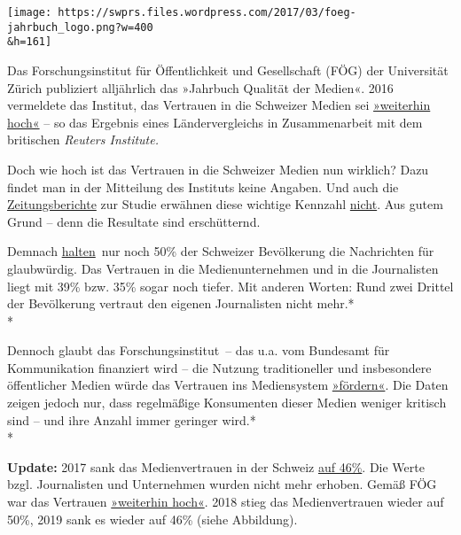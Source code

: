 \texttt{[image: https://swprs.files.wordpress.com/2017/03/foeg-jahrbuch\_logo.png?w=400\\\&h=161]}

Das Forschungsinstitut für Öffentlichkeit und Gesellschaft (FÖG) der
Universität Zürich publiziert alljährlich das »Jahrbuch Qualität der
Medien«. 2016 vermeldete das Institut, das Vertrauen in die Schweizer
Medien sei
\href{http://www.foeg.uzh.ch/dam/jcr:7234c6d3-1f09-4d36-b6ab-f14e659d046e/Medienmitteilung_JB_2016_dt.pdf}{»weiterhin
hoch«} -- so das Ergebnis eines Ländervergleichs in Zusammenarbeit mit
dem britischen \emph{Reuters Institute.}

Doch wie hoch ist das Vertrauen in die Schweizer Medien nun wirklich?
Dazu findet man in der Mitteilung des Instituts keine Angaben. Und auch
die
\href{http://www.tagesanzeiger.ch/schweiz/standard/Diese-Menschen-sind-anfaellig-fuer-Populisten/story/23804017}{Zeitungsberichte}
zur Studie erwähnen diese wichtige Kennzahl
\href{http://www.nzz.ch/schweiz/analyse-zum-medienvertrauen-oeffentliche-medien-staerken-auch-die-privaten-ld.128965}{nicht}.
Aus gutem Grund -- denn die Resultate sind erschütternd.

Demnach
\href{http://media.digitalnewsreport.org/wp-content/uploads/2018/11/Digital-News-Report-2016.pdf\#page=60}{halten}~nur
noch 50\% der Schweizer Bevölkerung die Nachrichten für glaubwürdig. Das
Vertrauen in die Medienunternehmen und in die Journalisten liegt mit
39\% bzw. 35\% sogar noch tiefer. Mit anderen Worten: Rund zwei Drittel
der Bevölkerung vertraut den eigenen Journalisten nicht mehr.*\\
*

Dennoch glaubt das Forschungsinstitut~-- das u.a. vom Bundesamt für
Kommunikation finanziert wird -- die Nutzung traditioneller und
insbesondere öffentlicher Medien würde das Vertrauen ins Mediensystem
\href{http://www.foeg.uzh.ch/dam/jcr:7234c6d3-1f09-4d36-b6ab-f14e659d046e/Medienmitteilung_JB_2016_dt.pdf}{»fördern«}.
Die Daten zeigen jedoch nur, dass regelmäßige Konsumenten dieser Medien
weniger kritisch sind -- und ihre Anzahl immer geringer wird.*\\
*

\textbf{Update:} 2017 sank das Medienvertrauen in der Schweiz
\href{http://www.digitalnewsreport.org/survey/2017/switzerland-2017/}{auf
46\%}. Die Werte bzgl. Journalisten und Unternehmen wurden nicht mehr
erhoben. Gemäß FÖG war das Vertrauen
\href{http://www.foeg.uzh.ch/dam/jcr:0d0e5a10-27be-4e97-b264-b2cf7de96bbd/Broschur_Jahrbuch_foeg_deutsch_2017_ohne_Sperrvermerk.pdf}{»weiterhin
hoch«}. 2018 stieg das Medienvertrauen wieder auf 50\%, 2019 sank es
wieder auf 46\% (siehe Abbildung).

